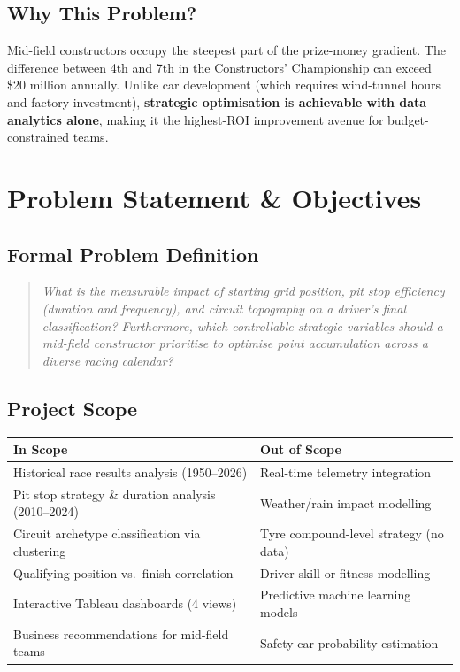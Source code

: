 \documentclass[12pt, a4paper]{article}
\begin{document}
\subsection{Why This Problem?}
Mid-field constructors occupy the steepest part of the prize-money gradient. The difference between 4th and 7th in the Constructors' Championship can exceed \$20 million annually. Unlike car development (which requires wind-tunnel hours and factory investment), \textbf{strategic optimisation is achievable with data analytics alone}, making it the highest-ROI improvement avenue for budget-constrained teams.

\newpage

\section{Problem Statement \& Objectives}

\subsection{Formal Problem Definition}
\begin{quote}
\textit{What is the measurable impact of starting grid position, pit stop efficiency (duration and frequency), and circuit topography on a driver's final classification? Furthermore, which controllable strategic variables should a mid-field constructor prioritise to optimise point accumulation across a diverse racing calendar?}
\end{quote}

\subsection{Project Scope}

\begin{tabularx}{\textwidth}{l X}
\toprule
\textbf{In Scope} & \textbf{Out of Scope} \\
\midrule
Historical race results analysis (1950--2026) & Real-time telemetry integration \\
Pit stop strategy \& duration analysis (2010--2024) & Weather/rain impact modelling \\
Circuit archetype classification via clustering & Tyre compound-level strategy (no data) \\
Qualifying position vs.\ finish correlation & Driver skill or fitness modelling \\
Interactive Tableau dashboards (4 views) & Predictive machine learning models \\
Business recommendations for mid-field teams & Safety car probability estimation \\
\bottomrule
\end{tabularx}
\end{document}
